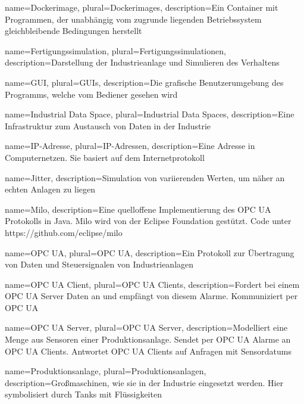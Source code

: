 
{
  name=Dockerimage,
  plural=Dockerimages,
  description={Ein Container mit Programmen, der unabhängig vom zugrunde liegenden Betriebssystem gleichbleibende Bedingungen herstellt}
}

{
  name=Fertigungssimulation,
  plural=Fertigungssimulationen,
  description={Darstellung der Industrieanlage und Simulieren des Verhaltens}
}

{
  name=GUI,
  plural=GUIs,
  description={Die grafische Benutzerumgebung des Programms, welche vom Bediener gesehen wird}
}

{
  name=Industrial Data Space,
  plural=Industrial Data Spaces,
  description={Eine Infrastruktur zum Austausch von Daten in der Industrie}
}

{
  name=IP-Adresse,
  plural=IP-Adressen,
  description={Eine Adresse in Computernetzen. Sie basiert auf dem Internetprotokoll}
}

{
  name=Jitter,
  description={Simulation von variierenden Werten, um näher an echten Anlagen zu liegen}
}

{
  name=Milo,
  description={Eine quelloffene Implementierung des \gls{OPC UA} Protokolls in Java. Milo wird von der Eclipse Foundation gest\"utzt. Code unter https://github.com/eclipse/milo}
}

{
  name=OPC UA,
  plural=OPC UA,
  description={Ein Protokoll zur Übertragung von Daten und Steuersignalen von Industrieanlagen}
}

{
  name=OPC UA Client,
  plural=OPC UA Clients,
  description={Fordert bei einem \gls{OPC UA Server} Daten an und empf\"angt von diesem Alarme. Kommuniziert per \gls{OPC UA}}
}

{
  name=OPC UA Server,
  plural=OPC UA Server,
  description={Modelliert eine Menge aus Sensoren einer \gls{Produktionsanlage}. Sendet per \gls{OPC UA} Alarme an \glspl{OPC UA Client}. Antwortet \glspl{OPC UA Client} auf Anfragen mit \glspl{Sensordatum}}
}

{
  name=Produktionsanlage,
  plural=Produktionsanlagen,
  description={Großmaschinen, wie sie in der Industrie eingesetzt werden. Hier symbolisiert durch Tanks mit Flüssigkeiten}
}

